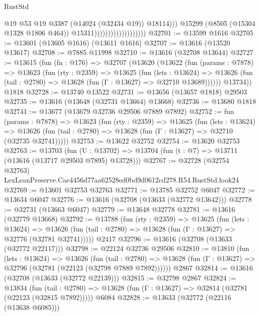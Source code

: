 \begin{lexlean}{RustStd}
\begin{coremodule}
                                                @19
                                                @53
                                                @19
                                                @3387
                                                (@14024 (@32434 @19))
                                                @18114)))
                                          @15299
                                          (@8505 (@15304 @1328 @1806 @464))
                                          @15311)))))))))))))))))))
@32701 := @13599 @1616
@32705 := @13601 (@13605 @1616) (@13611 @1616)
@32707 := @13616 (@13520 @13617)
@32708 := @7885 @11998
@32710 := @13616 (@32708 @13644)
@32727 := @13615
    (fun (fn : @176) =>
    @32707
      (@13620
        (@13622
          (fun (params : @7878) =>
          @13623
            (fun (rty : @2359) =>
            @13625
              (fun (lets : @13624) =>
              @13626 (fun (tail : @2780) => @13628 (fun (Γ : @13627) => @32710 @13689))))))
        @13734))
    @1818
@32728 := @13740 @13522
@32731 := @13656 (@13657 @1818) @29503
@32735 := @13616 (@13648 (@32731 @13664) @13668)
@32736 := @13680 @1818
@32741 := @13677 (@13679 @32736 @29506 @7889 @7892)
@32752 := fun (params : @7878) =>
  @13623
    (fun (rty : @2359) =>
    @13625
      (fun (lets : @13624) =>
      @13626 (fun (tail : @2780) => @13628 (fun (Γ : @13627) => @32710 (@32735 @32741)))))
@32753 := @13622 @32752
@32754 := @13620 @32753
@32763 := @13703
    (fun (U : @13702) => @13704 (fun (t : @7) => @13711 (@13616 (@13717 @29503 @7895) @13728)))
@32767 := @32728
    (@32754 @32763)
    LexLeanPreserve.Cae4456d77aa62528ed0bd9d0612cd278.R54.RustStd.look24
@32769 := @13601 @32753 @32763
@32771 := @13785 @32752 @6047
@32772 := @13634 @6047
@32776 := @13616 (@32708 (@13633 (@32772 @13642)))
@32778 := @32731 (@13663 @6047)
@32779 := @13648 @32778
@32781 := @13616 (@32779 @13668)
@32792 := @13788
    (fun (rty : @2359) =>
    @13625
      (fun (lets : @13624) =>
      @13626 (fun (tail : @2780) => @13628 (fun (Γ : @13627) => @32776 (@32781 @32741)))))
    @2417
@32796 := @13616 (@32708 (@13633 (@32772 @22117)))
@32798 := @22124 @32736 @29506
@32810 := @13810
    (fun (lets : @13624) =>
    @13626
      (fun (tail : @2780) =>
      @13628 (fun (Γ : @13627) => @32796 (@32781 (@22123 (@32798 @7889 @7892))))))
    @2867
@32814 := @13616 (@32708 (@13633 (@32772 @22139)))
@32815 := @32798 @2867
@32824 := @13834
    (fun (tail : @2780) => @13628 (fun (Γ : @13627) => @32814 (@32781 (@22123 (@32815 @7892)))))
    @6084
@32828 := @13633 (@32772 (@22116 (@13638 @6085)))

\end{coremodule}
\end{lexlean}
